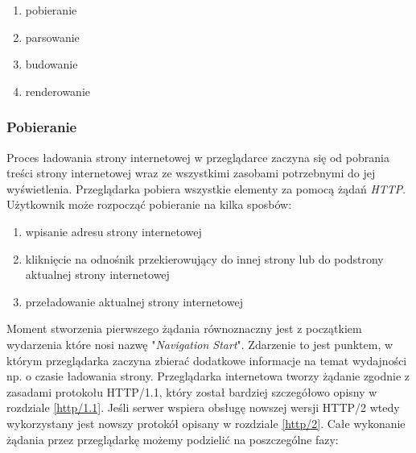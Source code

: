 \documentclass[polish, twoside, 12pt]{mwart}
\begin{document}
\begin{enumerate}
  \item pobieranie
  \item parsowanie
  \item budowanie
  \item renderowanie
\end{enumerate}

\subsubsection{Pobieranie}

Proces ładowania strony internetowej w przeglądarce zaczyna się od pobrania treści strony internetowej wraz ze wszystkimi zasobami potrzebnymi do jej wyświetlenia.
Przeglądarka pobiera wszystkie elementy za pomocą żądań \emph{HTTP}. Użytkownik może rozpocząć pobieranie na kilka sposbów:

\begin{enumerate}
  \item wpisanie adresu strony internetowej
  \item kliknięcie na odnośnik przekierowujący do innej strony lub do podstrony aktualnej strony internetowej
  \item przeładowanie aktualnej strony internetowej
\end{enumerate}

Moment stworzenia pierwszego żądania równoznaczny jest z początkiem wydarzenia które nosi nazwę "\emph{Navigation Start}". Zdarzenie to jest punktem, w którym przeglądarka zaczyna zbierać dodatkowe informacje na temat wydajności np. o czasie ładowania strony. Przeglądarka internetowa tworzy żądanie zgodnie z zasadami protokołu HTTP/1.1, który został bardziej szczegółowo opisny w rozdziale \ref{http/1.1}. Jeśli serwer wspiera obsługę nowszej wersji HTTP/2 wtedy wykorzystany jest nowszy protokół opisany w rozdziale \ref{http/2}. Całe wykonanie żądania przez przeglądarkę możemy podzielić na poszczególne fazy:
\end{document}
